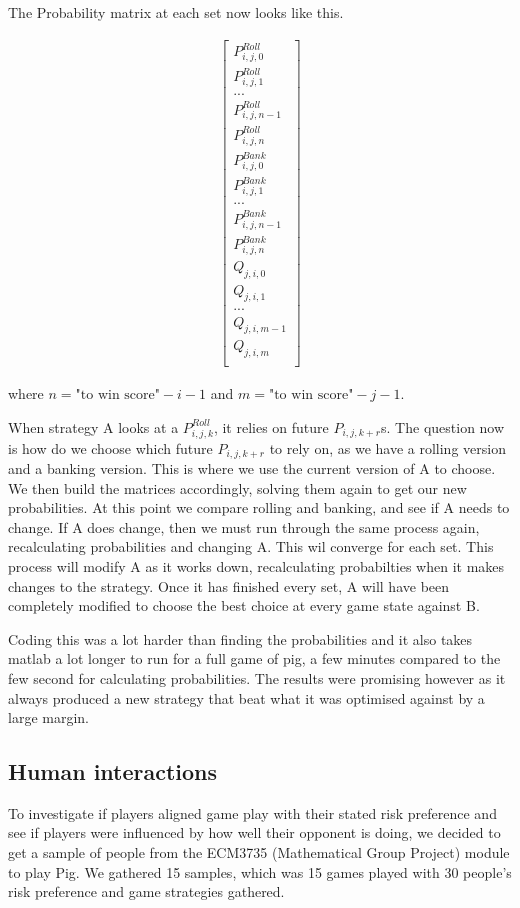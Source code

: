 \documentclass[a4paper,titlepage]{article}
\begin{document}
The Probability matrix at each set now looks like this.

\begin{align}
	\begin{bmatrix}
		P^{Roll}_{i,j,0}\\
		P^{Roll}_{i,j,1}\\
		...\\
		P^{Roll}_{i,j,n-1}\\
		P^{Roll}_{i,j,n}\\
		P^{Bank}_{i,j,0}\\
		P^{Bank}_{i,j,1}\\
		...\\
		P^{Bank}_{i,j,n-1}\\
		P^{Bank}_{i,j,n}\\
		Q_{j,i,0}\\
		Q_{j,i,1}\\
		...\\
		Q_{j,i,m-1}\\
		Q_{j,i,m}\\
	\end{bmatrix}
\end{align}

where $n=\text{"to win score"}-i-1$ and $m=\text{"to win score"}-j-1$.

When strategy A looks at a $P^{Roll}_{i,j,k}$, it relies on future $P_{i,j,k+r}$s. The question now is how do we choose which future $P_{i,j,k+r}$ to rely on, as we have a rolling version and a banking version. This is where we use the current version of A to choose. We then build the matrices accordingly, solving them again to get our new probabilities. At this point we compare rolling and banking, and see if A needs to change. If A does change, then we must run through the same process again, recalculating probabilities and changing A. This wil converge for each set. This process will modify A as it works down, recalculating probabilties when it makes changes to the strategy. Once it has finished every set, A will have been completely modified to choose the best choice at every game state against B.

Coding this was a lot harder than finding the probabilities and it also takes matlab a lot longer to run for a full game of pig, a few minutes compared to the few second for calculating probabilities. The results were promising however as it always produced a new strategy that beat what it was optimised against by a large margin.

\subsection{Human interactions}
To investigate if players aligned game play with their stated risk preference and see if players were influenced by how well their opponent is doing, we decided to get a sample of people from the ECM3735 (Mathematical Group Project) module to play Pig. We gathered 15 samples, which was 15 games played with 30 people’s risk preference and game strategies gathered.
\end{document}
